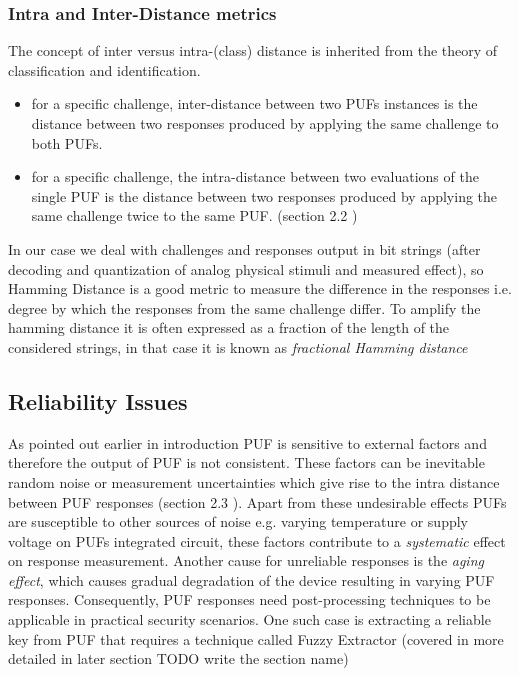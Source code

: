 \subsubsection{Intra and Inter-Distance metrics}
\label{intra_inter_section}
The concept of inter versus intra-(class) distance is inherited from the theory of classification and identification.
\begin{itemize}
	\item for a specific challenge, inter-distance between two PUFs instances is the distance between two responses produced by applying the same challenge to both PUFs.
	\item for a specific challenge, the intra-distance between two evaluations of the single PUF is the distance between two responses produced by applying the same challenge twice to the same PUF. (section 2.2 \cite{thbook})
\end{itemize}

In our case we deal with challenges and responses output in bit strings (after decoding and quantization of analog physical stimuli and measured effect), so Hamming Distance is a good metric to measure the difference in the responses i.e. degree by which the responses from the same challenge differ. To amplify the hamming distance it is often expressed as a fraction of the length of the considered strings, in that case it is known as \emph{fractional Hamming distance}

\subsection{Reliability Issues}
As pointed out earlier in introduction PUF is sensitive to external factors and therefore the output of PUF is not consistent. These factors can be inevitable random noise or measurement uncertainties which give rise to the intra distance between PUF responses (section 2.3 \cite{thbook}). Apart from these undesirable effects PUFs are susceptible to other sources of noise e.g. varying temperature or supply voltage on PUFs integrated circuit, these factors contribute to a \emph{systematic} effect on
response measurement. Another cause for unreliable responses is the \emph{aging effect}, which causes gradual degradation of the device resulting in varying PUF responses. Consequently, PUF responses need post-processing techniques to be applicable in practical security scenarios. One such case is extracting a reliable key from PUF that requires a technique called Fuzzy Extractor (covered in more detailed in later section TODO write the section name)

